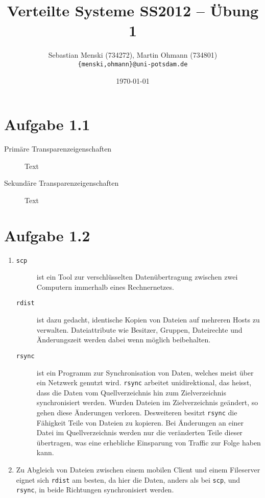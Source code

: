\documentclass[german,12pt,a4paper]{article}
\begin{document}
\title{\textbf{Verteilte Systeme SS2012 -- Übung 1}}
\author{Sebastian Menski (734272), Martin Ohmann (734801) \\ \texttt{\{menski,ohmann\}@uni-potsdam.de}}
\date{\today}

\maketitle

\section*{Aufgabe 1.1}

\begin{description}
	\item[Primäre Transparenzeigenschaften] Text
	\item[Sekundäre Transparenzeigenschaften] Text
\end{description}


\section*{Aufgabe 1.2}

\begin{enumerate}
	\item 
		\begin{description}
			\item[\texttt{scp}] ist ein Tool zur verschlüsselten Datenübertragung 
				zwischen zwei Computern immerhalb eines Rechnernetzes.
			\item[\texttt{rdist}] ist dazu gedacht, identische Kopien von Dateien 
				auf mehreren Hosts zu verwalten. Dateiattribute wie Besitzer, Gruppen, 
				Dateirechte und Änderungszeit werden dabei wenn möglich beibehalten.
			\item[\texttt{rsync}] ist ein Programm zur Synchronisation von Daten, 
				welches meist über ein Netzwerk genutzt wird. \texttt{rsync} arbeitet
				unidirektional, das heisst, dass die Daten vom 
				Quellverzeichnis hin zum Zielverzeichnis synchronisiert werden. Wurden 
				Dateien im Zielverzeichnis geändert, so gehen diese Änderungen verloren.
				Desweiteren besitzt \texttt{rsync} die Fähigkeit Teile von Dateien 
				zu kopieren. Bei Änderungen an einer Datei im Quellverzeichnis werden 
				nur die veränderten Teile dieser übertragen, was eine erhebliche Einsparung von 
				Traffic zur Folge haben kann.
		\end{description}
	\item Zu Abgleich von Dateien zwischen einem mobilen Client und einem Fileserver 
		eignet sich \texttt{rdist} am besten, da hier die Daten, anders als bei \texttt{scp},
		und \texttt{rsync}, in beide Richtungen synchronisiert werden.
\end{enumerate}
\end{document}
